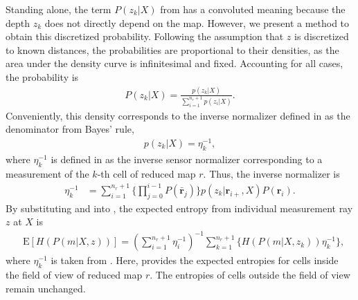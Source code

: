 Standing alone, the term $P(z_{k}|X)$ from  has a convoluted meaning because the depth $z_{k}$ does not directly depend on the map. However, we present a method to obtain this discretized probability. %
Following the assumption that $z$ is discretized to known distances, the probabilities are proportional to their densities, as the area under the density curve is infinitesimal and fixed. Accounting for all cases, the probability is
\begin{align}
\label{eqn:ProbWithDelta}
P(z_{k}|X)=\frac{p(z_{k}|X)}{\sum_{i=1}^{n_{r}+1}p(z_{i}|X)}.
\end{align}
Conveniently, this density corresponds to the inverse normalizer defined in  as the denominator from Bayes' rule,
\begin{align}
\label{eqn:DiscretizedProb}
p(z_{k}|X)=\eta_{k}^{-1},
\end{align}
where $\eta_{k}^{-1}$ is defined in  as the inverse sensor normalizer corresponding to a measurement of the $k$-th cell of reduced map $r$. Thus, the inverse normalizer is
\begin{align}
\label{eqn:allEtaAtCAppendix}
\eta_{k}^{-1}
&=
\sum_{i=1}^{n_{r}+1}\bigg\{\prod_{j=0}^{i-1}P(\bar{\mathbf{r}}_{j})\bigg\} p(z_{k}|\mathbf{r}_{i+},X)P(\mathbf{r}_{i}).
\end{align}
By substituting  and  into , the expected entropy from individual measurement ray $z$ at $X$ is
\begin{align}
\label{eqn:HRayCompleteAppendix}
&\text{E}[H(P(m|X,z))]=\left(\sum_{i=1}^{n_{r}+1}\eta_{i}^{-1}\right)^{-1}\sum_{k=1}^{n_{r}+1}\bigg\{H(P(m|X,z_{k}))\eta_{k}^{-1}\bigg\},
\end{align}
where $\eta_{k}^{-1}$ is taken from .
Here,  provides the expected entropies for cells inside the field of view of reduced map $r$. %
The entropies of cells outside the field of view remain unchanged.







